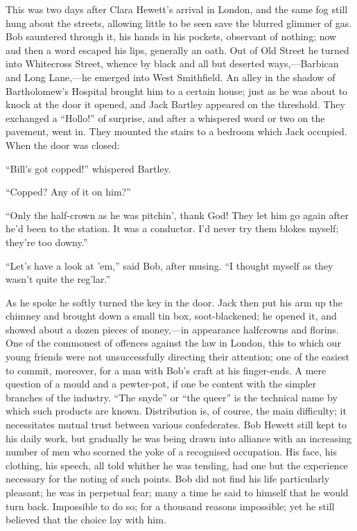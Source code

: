 This was two days after Clara Hewett's arrival in London, and the same
fog still hung about the streets, allowing little to be seen save the
blurred glimmer of gas. Bob sauntered through it, his hands in his
pockets, observant of nothing; now aud then a word escaped his lips,
generally an oath. Out of Old Street he turned into Whitecross Street,
whence by black and all but deserted ways,---Barbican and Long
Lane,---he emerged into West Smithfield. An alley in the shadow of
Bartholomew's Hospital brought him to a certain house; just as he was
about to knock {\protect\hypertarget{37}{}{}}at the door it opened, and
Jack Bartley appeared on the threshold. They exchanged a ``Hollo!'' of
surprise, and after a whispered word or two on the pavement, went in.
They mounted the stairs to a bedroom which Jack occupied. When the door
was closed:

``Bill's got copped!'' whispered Bartley.

``Copped? Any of it on him?''

``Only the half-crown as he was pitchin', thank God! They let him go
again after he'd been to the station. It was a conductor. I'd never try
them blokes myself; they're too downy.''

``Let's have a look at 'em,'' said Bob, after musing. ``I thought myself
as they wasn't quite the reg'lar.''

As he spoke he softly turned the key in the door. Jack then put his arm
up the chimney and brought down a small tin box, soot-blackened; he
opened it, and showed about a dozen pieces of money,---in appearance
halfcrowns and florins. One of the commonest of offences against the law
in London, this to which our young friends were not unsuccessfully
directing their attention; one of the easiest to commit, moreover, for a
man with {\protect\hypertarget{38}{}{}}Bob's craft at his finger-ends. A
mere question of a mould and a pewter-pot, if one be content with the
simpler branches of the industry. ``The snyde'' or ``the queer'' is the
technical name by which such products are known. Distribution is, of
course, the main difficulty; it necessitates mutual trust between
various confederates. Bob Hewett still kept to his daily work, but
gradually he was being drawn into alliance with an increasing number of
men who scorned the yoke of a recognised occupation. His face, his
clothing, his speech, all told whither he was tending, had one but the
experience necessary for the noting of such points. Bob did not find his
life particularly pleasant; he was in perpetual fear; many a time he
said to himself that he would turn back. Impossible to do so; for a
thousand reasons impossible; yet he still believed that the choice lay
with him.

